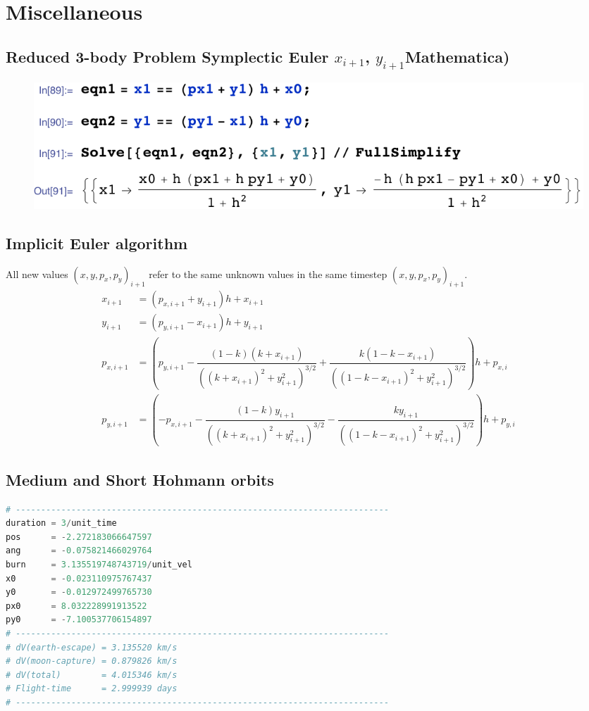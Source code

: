\chapter{Miscellaneous} \label{app:misc}
\section{Reduced 3-body Problem Symplectic Euler \texorpdfstring{$x_{i+1}$, $y_{i+1}$} (Mathematica)} \label{app:r3b-symplectic-euler}
\begin{figure}[h!]
\centering 
\includegraphics[scale=0.8]{appendices/Miscellaneous/symplectic_euler_derivation.pdf}
\end{figure}

\section{Implicit Euler algorithm} \label{app:implicit_euler}
All new values $(x,y,p_x,p_y)_{i+1}$ refer to the same unknown values in the same timestep $(x,y,p_x,p_y)_{i+1}$.
\begin{align}
x_{i+1} &= (p_{x,i+1} + y_{i+1})h + x_{i+1} \\[0.2cm]
y_{i+1} &= (p_{y,i+1} - x_{i+1})h + y_{i+1} \\[0.2cm]
p_{x,i+1} &= \left(p_{y,i+1} - \dfrac{(1-k)(k+x_{i+1})}{((k+x_{i+1})^2+y_{i+1}^2)^{3/2}} + \dfrac{k(1-k-x_{i+1})}{((1-k-x_{i+1})^2+y_{i+1}^2)^{3/2}}\right)h + p_{x,i} \\[0.2cm]
p_{y,i+1} &= \left(-p_{x,i+1} - \dfrac{(1-k)y_{i+1}}{((k+x_{i+1})^2+y_{i+1}^2)^{3/2}} - \dfrac{k y_{i+1}}{((1-k-x_{i+1})^2+y_{i+1}^2)^{3/2}}\right)h + p_{y,i}
\end{align}

\section{Medium and Short Hohmann orbits} \label{app:more_hohmann}
\begin{adjustwidth*}{0cm}{-0.4cm}
\begin{lstlisting}[language=Python,caption=Medium duration Hohmann]
# --------------------------------------------------------------------------
duration = 3/unit_time
pos      = -2.272183066647597
ang      = -0.075821466029764
burn     = 3.135519748743719/unit_vel
x0       = -0.023110975767437
y0       = -0.012972499765730
px0      = 8.032228991913522
py0      = -7.100537706154897
# --------------------------------------------------------------------------
# dV(earth-escape) = 3.135520 km/s
# dV(moon-capture) = 0.879826 km/s
# dV(total)        = 4.015346 km/s
# Flight-time      = 2.999939 days
# --------------------------------------------------------------------------
\end{lstlisting}
\end{adjustwidth*}


